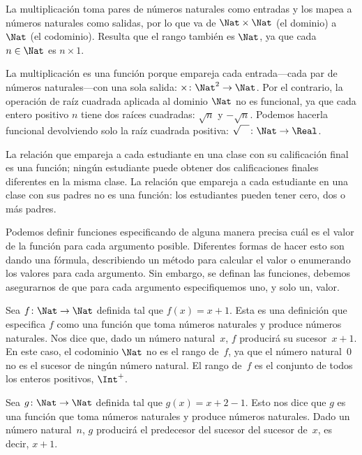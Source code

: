 \documentclass[../../../include/open-logic-section]{subfiles}
\begin{document}
\begin{ex}
La multiplicación toma pares de números naturales como entradas y los mapea a números naturales como salidas, por lo que va de $\Nat \times \Nat$ (el dominio) a $\Nat$ (el codominio). Resulta que el rango también es $\Nat$, ya que cada $n \in \Nat$ es $n \times 1$.
\end{ex}

\begin{ex}
La multiplicación es una función porque empareja cada entrada—cada par de números naturales—con una sola salida: $\times \colon \Nat^2 \to \Nat$. Por el contrario, la operación de raíz cuadrada aplicada al dominio $\Nat$ no es funcional, ya que cada entero positivo $n$ tiene dos raíces cuadradas: $\sqrt{n}$ y $-\sqrt{n}$. Podemos hacerla funcional devolviendo solo la raíz cuadrada positiva: $\sqrt{\phantom{X}} \colon \Nat \to \Real$.
\end{ex}

\begin{ex}
La relación que empareja a cada estudiante en una clase con su calificación final es una función; ningún estudiante puede obtener dos calificaciones finales diferentes en la misma clase. La relación que empareja a cada estudiante en una clase con sus padres no es una función: los estudiantes pueden tener cero, dos o más padres.
\end{ex}

\begin{explain}
Podemos definir funciones especificando de alguna manera precisa cuál es el valor de la función para cada argumento posible. Diferentes formas de hacer esto son dando una fórmula, describiendo un método para calcular el valor o enumerando los valores para cada argumento. Sin embargo, se definan las funciones, debemos asegurarnos de que para cada argumento especifiquemos uno, y solo un, valor.
\end{explain}

\begin{ex}
Sea $f \colon \Nat \to \Nat$ definida tal que $f(x) = x+1$. Esta es una definición que especifica $f$ como una función que toma números naturales y produce números naturales. Nos dice que, dado un número natural~$x$, $f$ producirá su sucesor~$x+1$. En este caso, el codominio $\Nat$ no es el rango de~$f$, ya que el número natural~$0$ no es el sucesor de ningún número natural. El rango de~$f$ es el conjunto de todos los enteros positivos, $\Int^{+}$.
\end{ex}

\begin{ex}
Sea $g \colon \Nat \to \Nat$ definida tal que $g(x) = x+2-1$. Esto nos dice que $g$ es una función que toma números naturales y produce números naturales. Dado un número natural~$n$, $g$ producirá el predecesor del sucesor del sucesor de~$x$, es decir, $x+1$.
\end{ex}
\end{document}
